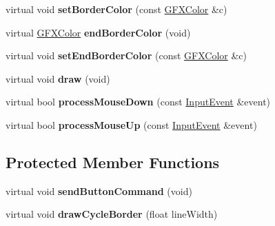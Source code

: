 \begin{DoxyCompactItemize}
\item 
virtual void {\bfseries set\+Border\+Color} (const \hyperlink{structGFXColor}{G\+F\+X\+Color} \&c)\hypertarget{classNewButton_a62006ecbee6ea312e47a265e7f667250}{}\label{classNewButton_a62006ecbee6ea312e47a265e7f667250}

\item 
virtual \hyperlink{structGFXColor}{G\+F\+X\+Color} {\bfseries end\+Border\+Color} (void)\hypertarget{classNewButton_a690dccf76800058f10e72517cdd53efc}{}\label{classNewButton_a690dccf76800058f10e72517cdd53efc}

\item 
virtual void {\bfseries set\+End\+Border\+Color} (const \hyperlink{structGFXColor}{G\+F\+X\+Color} \&c)\hypertarget{classNewButton_abd2d2bc76d7b626a9fd5cc9100240131}{}\label{classNewButton_abd2d2bc76d7b626a9fd5cc9100240131}

\item 
virtual void {\bfseries draw} (void)\hypertarget{classNewButton_a623fe082ca8d83c2ce9d557153e382c5}{}\label{classNewButton_a623fe082ca8d83c2ce9d557153e382c5}

\item 
virtual bool {\bfseries process\+Mouse\+Down} (const \hyperlink{structInputEvent}{Input\+Event} \&event)\hypertarget{classNewButton_a96e86922b7ce06f4464bdf1fdd5a831f}{}\label{classNewButton_a96e86922b7ce06f4464bdf1fdd5a831f}

\item 
virtual bool {\bfseries process\+Mouse\+Up} (const \hyperlink{structInputEvent}{Input\+Event} \&event)\hypertarget{classNewButton_ae2f87cb9e89fb1852687f615de13f268}{}\label{classNewButton_ae2f87cb9e89fb1852687f615de13f268}

\end{DoxyCompactItemize}
\subsection*{Protected Member Functions}
\begin{DoxyCompactItemize}
\item 
virtual void {\bfseries send\+Button\+Command} (void)\hypertarget{classNewButton_afbc37ffefc6e80713c0aa629fb460311}{}\label{classNewButton_afbc37ffefc6e80713c0aa629fb460311}

\item 
virtual void {\bfseries draw\+Cycle\+Border} (float line\+Width)\hypertarget{classNewButton_a199c5c085c5fd07d44dd419fea1c5f43}{}\label{classNewButton_a199c5c085c5fd07d44dd419fea1c5f43}

\end{DoxyCompactItemize}
